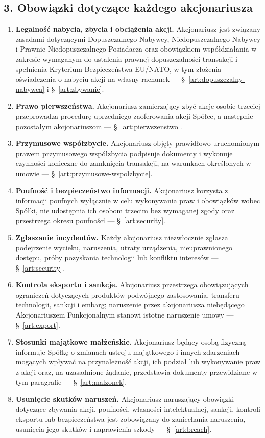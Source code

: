 \documentclass[12pt,a4paper]{report}
\newcounter{paragraf}
\begin{document}
\subsection*{3. Obowiązki dotyczące każdego akcjonariusza}
\begin{enumerate}
  \item \textbf{Legalność nabycia, zbycia i obciążenia akcji.} Akcjonariusz jest związany zasadami dotyczącymi Dopuszczalnego Nabywcy, Niedopuszczalnego Nabywcy i Prawnie Niedopuszczalnego Posiadacza oraz obowiązkiem współdziałania w zakresie wymaganym do ustalenia prawnej dopuszczalności transakcji i spełnienia Kryterium Bezpieczeństwa EU/NATO, w tym złożenia oświadczenia o nabyciu akcji na własny rachunek — §~\ref{art:dopuszczalny-nabywca} i §~\ref{art:zbywanie}.
  \item \textbf{Prawo pierwszeństwa.} Akcjonariusz zamierzający zbyć akcje osobie trzeciej przeprowadza procedurę uprzedniego zaoferowania akcji Spółce, a następnie pozostałym akcjonariuszom — §~\ref{art:pierwszenstwo}.
  \item \textbf{Przymusowe współzbycie.} Akcjonariusz objęty prawidłowo uruchomionym prawem przymusowego współzbycia podpisuje dokumenty i wykonuje czynności konieczne do zamknięcia transakcji, na warunkach określonych w umowie — §~\ref{art:przymusowe-wspolzbycie}.
  \item \textbf{Poufność i bezpieczeństwo informacji.} Akcjonariusz korzysta z informacji poufnych wyłącznie w celu wykonywania praw i obowiązków wobec Spółki, nie udostępnia ich osobom trzecim bez wymaganej zgody oraz przestrzega okresu poufności — §~\ref{art:security}.
  \item \textbf{Zgłaszanie incydentów.} Każdy akcjonariusz niezwłocznie zgłasza podejrzenie wycieku, naruszenia, utraty urządzenia, nieuprawnionego dostępu, próby pozyskania technologii lub konfliktu interesów — §~\ref{art:security}.
  \item \textbf{Kontrola eksportu i sankcje.} Akcjonariusz przestrzega obowiązujących ograniczeń dotyczących produktów podwójnego zastosowania, transferu technologii, sankcji i embarg; naruszenie przez akcjonariusza niebędącego Akcjonariuszem Funkcjonalnym stanowi istotne naruszenie umowy — §~\ref{art:export}.
  \item \textbf{Stosunki majątkowe małżeńskie.} Akcjonariusz będący osobą fizyczną informuje Spółkę o zmianach ustroju majątkowego i innych zdarzeniach mogących wpływać na przynależność akcji, ich podział lub wykonywanie praw z akcji oraz, na uzasadnione żądanie, przedstawia dokumenty przewidziane w tym paragrafie — §~\ref{art:malzonek}.
  \item \textbf{Usunięcie skutków naruszeń.} Akcjonariusz naruszający obowiązki dotyczące zbywania akcji, poufności, własności intelektualnej, sankcji, kontroli eksportu lub bezpieczeństwa jest zobowiązany do zaniechania naruszenia, usunięcia jego skutków i naprawienia szkody — §~\ref{art:breach}.
\end{enumerate}
\end{document}
